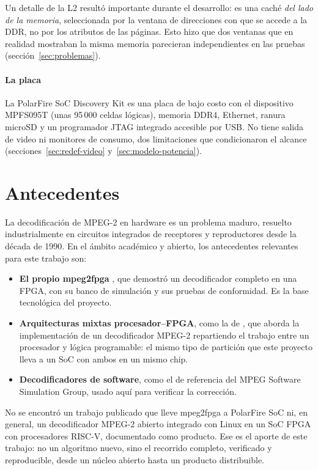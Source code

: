 Un detalle de la L2 resultó importante durante el desarrollo: es una caché
\emph{del lado de la memoria}, seleccionada por la ventana de direcciones con
que se accede a la DDR, no por los atributos de las páginas. Esto hizo que
dos ventanas que en realidad mostraban la misma memoria parecieran
independientes en las pruebas (sección~\ref{sec:problemas}).

\paragraph{La placa}
La PolarFire SoC Discovery Kit \citep{Microchip_Discovery_UG} es una placa de
bajo costo con el dispositivo MPFS095T (unas 95\,000 celdas lógicas), memoria
DDR4, Ethernet, ranura microSD y un programador JTAG integrado accesible por
USB. No tiene salida de video ni monitores de consumo, dos limitaciones que
condicionaron el alcance (secciones~\ref{sec:redef-video}
y~\ref{sec:modelo-potencia}).

\section{Antecedentes}
\label{sec:antecedentes}

La decodificación de MPEG-2 en hardware es un problema maduro, resuelto
industrialmente en circuitos integrados de receptores y reproductores desde
la década de 1990. En el ámbito académico y abierto, los antecedentes
relevantes para este trabajo son:

\begin{itemize}
  \item \textbf{El propio mpeg2fpga} \citep{De_Vleeschauwer_2017}, que
    demostró un decodificador completo en una FPGA, con su banco de
    simulación y sus pruebas de conformidad. Es la base tecnológica del
    proyecto.
  \item \textbf{Arquitecturas mixtas procesador--FPGA}, como la de
    \citet{Billaud_2004}, que aborda la implementación de un decodificador
    MPEG-2 repartiendo el trabajo entre un procesador y lógica
    programable: el mismo tipo de partición que este proyecto lleva a un SoC
    con ambos en un mismo chip.
  \item \textbf{Decodificadores de software}, como el de referencia del MPEG
    Software Simulation Group, usado aquí para verificar la corrección.
\end{itemize}

No se encontró un trabajo publicado que lleve mpeg2fpga a PolarFire SoC ni,
en general, un decodificador MPEG-2 abierto integrado con Linux en un SoC FPGA
con procesadores RISC-V, documentado como producto. Ese es el aporte de este
trabajo: no un algoritmo nuevo, sino el recorrido completo, verificado y
reproducible, desde un núcleo abierto hasta un producto distribuible.

